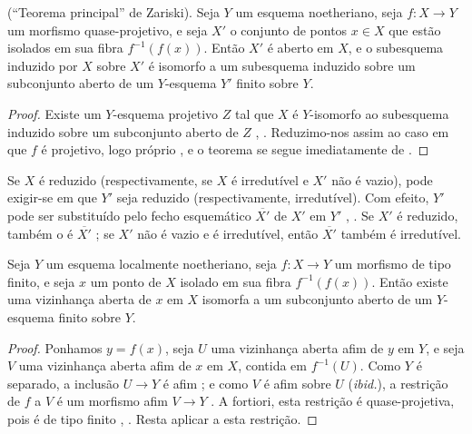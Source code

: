 \begin{theorem}[4.4.3]
\label{III.4.4.3}
\textnormal{(``Teorema principal'' de Zariski).}
Seja $Y$ um esquema noetheriano, seja $f:X\to Y$ um morfismo
quase-projetivo, e seja $X'$ o conjunto de pontos $x\in X$ que estão
isolados em sua fibra $f^{-1}(f(x))$. Então $X'$ é aberto em $X$,
e o subesquema induzido por $X$ sobre $X'$ é isomorfo a um
subesquema induzido sobre um subconjunto aberto de um $Y$-esquema
$Y'$ finito sobre $Y$.
\end{theorem}

\begin{proof}
Existe um $Y$-esquema projetivo $Z$ tal que $X$ é
$Y$-isomorfo ao subesquema induzido sobre um subconjunto aberto de
$Z$ , . Reduzimo-nos assim ao
caso em que $f$ é projetivo, logo próprio , e o
teorema se segue imediatamente de
.
\end{proof}

\begin{remark}[4.4.4]
\label{III.4.4.4}
Se $X$ é reduzido (respectivamente, se $X$ é irredutível e $X'$ não
é vazio), pode exigir-se em  que $Y'$ seja reduzido
(respectivamente, irredutível). Com efeito, $Y'$ pode ser substituído pelo
fecho esquemático $\overline{X'}$ de $X'$ em $Y'$
, . Se $X'$ é reduzido, também
o é $\overline{X'}$ ; se $X'$ não é vazio e é
irredutível, então $\overline{X'}$ também é irredutível.
\end{remark}

\begin{corollary}[4.4.5]
\label{III.4.4.5}
Seja $Y$ um esquema localmente noetheriano, seja $f:X\to Y$ um
morfismo de tipo finito, e seja $x$ um ponto de $X$ isolado em sua fibra
$f^{-1}(f(x))$. Então existe uma vizinhança aberta de $x$ em $X$
isomorfa a um subconjunto aberto de um $Y$-esquema finito sobre $Y$.
\end{corollary}

\begin{proof}
Ponhamos $y=f(x)$, seja $U$ uma vizinhança aberta afim de $y$ em $Y$, e
seja $V$ uma vizinhança aberta afim de $x$ em $X$, contida em
$f^{-1}(U)$. Como $Y$ é separado, a inclusão $U\to Y$ é afim
; e como $V$ é afim sobre $U$ (\emph{ibid.}), a
restrição de $f$ a $V$ é um morfismo afim $V\to Y$
. A fortiori, esta restrição é
quase-projetiva, pois é de tipo finito
, . Resta aplicar
 a esta restrição.
\end{proof}

